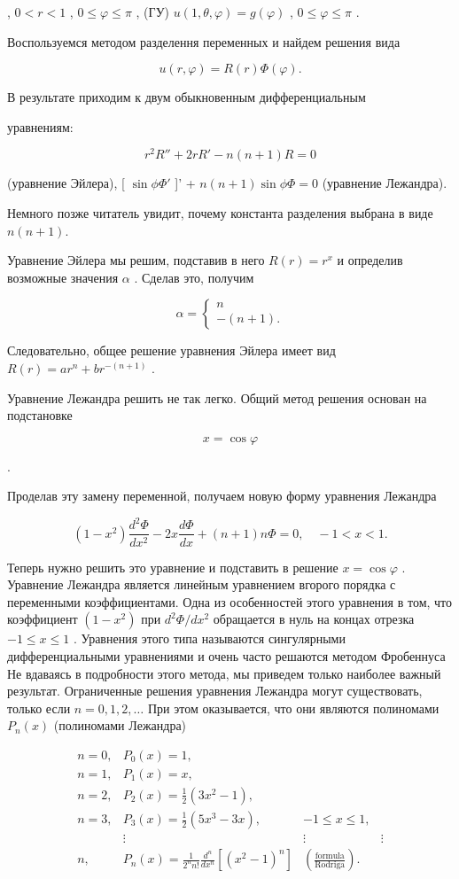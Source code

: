 \documentclass[
  ukrainian,
]{article}
\begin{document}
, \(0 < r < 1\) , \(0 \le \varphi \le \pi\) , (ГУ)
\(u(1, \theta, \varphi) = g(\varphi)\) , \(0 \le \varphi \le \pi\) .

Воспользуемся методом разделення переменных и найдем решения вида

\[
u(r, \varphi) = R(r) \Phi(\varphi).
\]

В результате приходим к двум обыкновенным дифференциальным

уравнениям:

\[
r^2R'' + 2rR' - n(n+1)R = 0
\]

(уравнение Эйлера), {[} \(\sin \phi \Phi'\) {]}' +
\(n(n+1)\sin \phi \Phi = 0\) (уравнение Лежандра).

Немного позже читатель увидит, почему константа разделения выбрана в
виде \(n(n+1)\).

Уравнение Эйлера мы решим, подставив в него \(R(r) = r^x\) и определив
возможные значения \(\alpha\) . Сделав это, получим

\[
\alpha = \begin{cases} n \\ -(n+1). \end{cases}
\]

Следовательно, общее решение уравнения Эйлера имеет вид
\(R(r) = ar^n + br^{-(n+1)}\) .

Уравнение Лежандра решить не так легко. Общий метод решения основан на
подстановке

\[
x = \cos \varphi
\]

.

Проделав эту замену переменной, получаем новую форму уравнения Лежандра

\[
(1-x^2)\frac{d^2\Phi}{dx^2} - 2x\frac{d\Phi}{dx} + (n+1)n\Phi = 0, \quad -1 < x < 1.
\]

Теперь нужно решить это уравнение и подставить в решение
\(x = \cos \varphi\) . Уравнение Лежандра является линейным уравнением
вгорого порядка с переменными коэффициентами. Одна из особенностей этого
уравнения в том, что коэффициент \((1-x^2)\) при \(d^2\Phi/dx^2\)
обращается в нуль на концах отрезка \(-1 \leqslant x \leqslant 1\) .
Уравнения этого типа называются сингулярными дифференциальными
уравнениями и очень часто решаются методом Фробеннуса Не вдаваясь в
подробности этого метода, мы приведем только наиболее важный результат.
Ограниченные решения уравнения Лежандра могут существовать, только если
\(n=0,1,2,\ldots\) При этом оказывается, что они являются полиномами
\(P_n(x)\) (полиномами Лежандра)

\[
\begin{array}{llll} n=0, & P_{0}(x)=1, \\ n=1, & P_{1}(x)=x, \\ n=2, & P_{2}(x)=\frac{1}{2}(3x^{2}-1), \\ n=3, & P_{3}(x)=\frac{1}{2}(5x^{3}-3x), & -1\leqslant x\leqslant 1, \\ & \vdots & \vdots & \vdots \\ n, & P_{n}(x)=\frac{1}{2^{n}n!}\frac{d^{n}}{dx^{n}}[(x^{2}-1)^{n}] & \left(\frac{\text{formula}}{\text{Rodriga}}\right). \end{array}
\]
\end{document}
